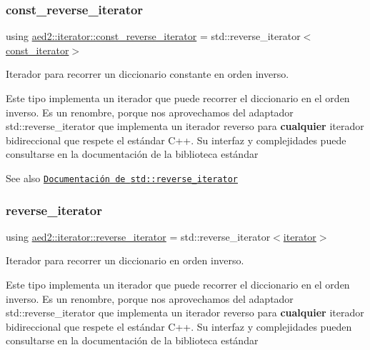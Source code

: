 \subsubsection{\texorpdfstring{const\+\_\+reverse\+\_\+iterator}{const\_reverse\_iterator}}
{\footnotesize\ttfamily using \hyperlink{classaed2_1_1iterator_a657402896e5b5966660032f5686cc4c4}{aed2\+::iterator\+::const\+\_\+reverse\+\_\+iterator} =  std\+::reverse\+\_\+iterator$<$\hyperlink{classaed2_1_1iterator_1_1const__iterator}{const\+\_\+iterator}$>$}



Iterador para recorrer un diccionario constante en orden inverso. 

Este tipo implementa un iterador que puede recorrer el diccionario en el orden inverso. Es un renombre, porque nos aprovechamos del adaptador {\ttfamily std\+::reverse\+\_\+iterator} que implementa un iterador reverso para {\bfseries cualquier} iterador bidireccional que respete el estándar C++. Su interfaz y complejidades puede consultarse en la documentación de la biblioteca estándar

\begin{DoxySeeAlso}{See also}
\href{http://en.cppreference.com/w/cpp/iterator/reverse_iterator}{\tt Documentación de {\ttfamily std\+::reverse\+\_\+iterator}} 
\end{DoxySeeAlso}
\mbox{\label{classaed2_1_1iterator_a07b2c0fa31611e03cd019b290acd6d80}} 
\subsubsection{\texorpdfstring{reverse\+\_\+iterator}{reverse\_iterator}}
{\footnotesize\ttfamily using \hyperlink{classaed2_1_1iterator_a07b2c0fa31611e03cd019b290acd6d80}{aed2\+::iterator\+::reverse\+\_\+iterator} =  std\+::reverse\+\_\+iterator$<$\hyperlink{classaed2_1_1iterator_1_1iterator}{iterator}$>$}



Iterador para recorrer un diccionario en orden inverso. 

Este tipo implementa un iterador que puede recorrer el diccionario en el orden inverso. Es un renombre, porque nos aprovechamos del adaptador {\ttfamily std\+::reverse\+\_\+iterator} que implementa un iterador reverso para {\bfseries cualquier} iterador bidireccional que respete el estándar C++. Su interfaz y complejidades pueden consultarse en la documentación de la biblioteca estándar

